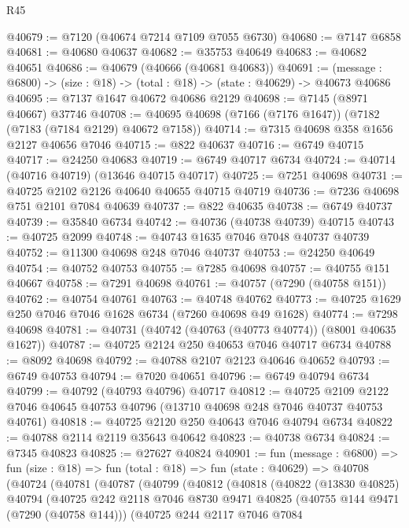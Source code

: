 \begin{lexlean}{R45}
\begin{coremodule}
{@40679 := @7120 (@40674 @7214 @7109 @7055 @6730)
@40680 := @7147 @6858
@40681 := @40680 @40637
@40682 := @35753 @40649
@40683 := @40682 @40651
@40686 := @40679 (@40666 (@40681 @40683))
@40691 := (message : @6800) -> (size : @18) -> (total : @18) -> (state : @40629) -> @40673 @40686
@40695 := @7137 @1647 @40672 @40686 @2129
@40698 := @7145 (@8971 @40667) @37746
@40708 := @40695 @40698 (@7166 (@7176 @1647)) (@7182 (@7183 (@7184 @2129) @40672 @7158))
@40714 := @7315 @40698 @358 @1656 @2127 @40656 @7046
@40715 := @822 @40637
@40716 := @6749 @40715
@40717 := @24250 @40683
@40719 := @6749 @40717 @6734
@40724 := @40714 (@40716 @40719) (@13646 @40715 @40717)
@40725 := @7251 @40698
@40731 := @40725 @2102 @2126 @40640 @40655 @40715 @40719
@40736 := @7236 @40698 @751 @2101 @7084 @40639
@40737 := @822 @40635
@40738 := @6749 @40737
@40739 := @35840 @6734
@40742 := @40736 (@40738 @40739) @40715
@40743 := @40725 @2099
@40748 := @40743 @1635 @7046 @7048 @40737 @40739
@40752 := @11300 @40698 @248 @7046 @40737
@40753 := @24250 @40649
@40754 := @40752 @40753
@40755 := @7285 @40698
@40757 := @40755 @151 @40667
@40758 := @7291 @40698
@40761 := @40757 (@7290 (@40758 @151))
@40762 := @40754 @40761
@40763 := @40748 @40762
@40773 := @40725 @1629 @250 @7046 @7046 @1628 @6734 (@7260 @40698 @49 @1628)
@40774 := @7298 @40698
@40781 := @40731 (@40742 (@40763 (@40773 @40774)) (@8001 @40635 @1627))
@40787 := @40725 @2124 @250 @40653 @7046 @40717 @6734
@40788 := @8092 @40698
@40792 := @40788 @2107 @2123 @40646 @40652
@40793 := @6749 @40753
@40794 := @7020 @40651
@40796 := @6749 @40794 @6734
@40799 := @40792 (@40793 @40796) @40717
@40812 := @40725
    @2109
    @2122
    @7046
    @40645
    @40753
    @40796
    (@13710 @40698 @248 @7046 @40737 @40753 @40761)
@40818 := @40725 @2120 @250 @40643 @7046 @40794 @6734
@40822 := @40788 @2114 @2119 @35643 @40642
@40823 := @40738 @6734
@40824 := @7345 @40823
@40825 := @27627 @40824
@40901 := fun (message : @6800) =>
  fun (size : @18) =>
  fun (total : @18) =>
  fun (state : @40629) =>
  @40708
    (@40724
      (@40781
        (@40787
          (@40799
            (@40812
              (@40818
                (@40822
                  (@13830 @40825)
                  @40794
                  (@40725
                    @242
                    @2118
                    @7046
                    @8730
                    @9471
                    @40825
                    (@40755 @144 @9471 (@7290 (@40758 @144)))
                    (@40725
                      @244
                      @2117
                      @7046
                      @7084
}
\end{coremodule}
\end{lexlean}
